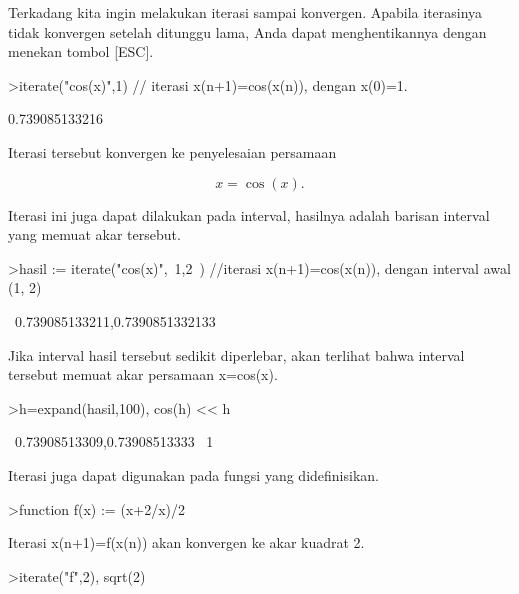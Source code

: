 \documentclass[a4paper,10pt]{article}
\begin{document}
\begin{eulernotebook}
\begin{eulercomment}
\begin{eulercomment}
\begin{eulercomment}
\begin{eulercomment}
\begin{eulercomment}
\begin{eulercomment}
\begin{eulercomment}
Terkadang kita ingin melakukan iterasi sampai konvergen. Apabila iterasinya tidak konvergen
setelah ditunggu lama, Anda dapat menghentikannya dengan menekan tombol [ESC].
\end{eulercomment}
\begin{eulerprompt}
>iterate("cos(x)",1) // iterasi x(n+1)=cos(x(n)), dengan x(0)=1.
\end{eulerprompt}
\begin{euleroutput}
  0.739085133216
\end{euleroutput}
\begin{eulercomment}
Iterasi tersebut konvergen ke penyelesaian persamaan

\end{eulercomment}
\begin{eulerformula}
\[
x = \cos(x).
\]
\end{eulerformula}
\begin{eulercomment}
Iterasi ini juga dapat dilakukan pada interval, hasilnya adalah barisan interval yang memuat
akar tersebut.
\end{eulercomment}
\begin{eulerprompt}
>hasil := iterate("cos(x)",~1,2~) //iterasi x(n+1)=cos(x(n)), dengan interval awal (1, 2)
\end{eulerprompt}
\begin{euleroutput}
  ~0.739085133211,0.7390851332133~
\end{euleroutput}
\begin{eulercomment}
Jika interval hasil tersebut sedikit diperlebar, akan terlihat bahwa interval tersebut
memuat akar persamaan x=cos(x).
\end{eulercomment}
\begin{eulerprompt}
>h=expand(hasil,100), cos(h) << h
\end{eulerprompt}
\begin{euleroutput}
  ~0.73908513309,0.73908513333~
  1
\end{euleroutput}
\begin{eulercomment}
Iterasi juga dapat digunakan pada fungsi yang didefinisikan.
\end{eulercomment}
\begin{eulerprompt}
>function f(x) := (x+2/x)/2
\end{eulerprompt}
\begin{eulercomment}
Iterasi x(n+1)=f(x(n)) akan konvergen ke akar kuadrat 2.
\end{eulercomment}
\begin{eulerprompt}
>iterate("f",2), sqrt(2)

\end{eulerprompt}
\end{eulercomment}
\end{eulercomment}
\end{eulercomment}
\end{eulercomment}
\end{eulercomment}
\end{eulercomment}
\end{eulernotebook}
\end{document}
